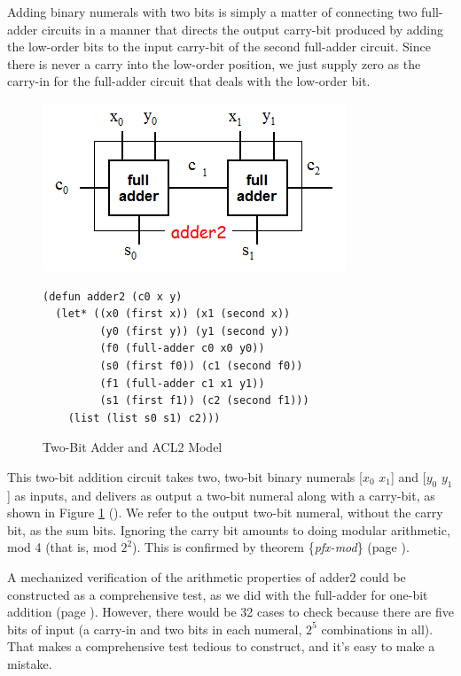 Adding binary numerals with two bits is simply a matter
of connecting two full-adder circuits in a manner that
directs the output carry-bit produced by adding the low-order bits
to the input carry-bit of the second full-adder circuit.
Since there is never a carry into the low-order position,
we just supply zero as the carry-in for the full-adder circuit
that deals with the low-order bit.

\begin{figure}
\begin{center}
\includegraphics[scale=0.25]{Images/adder2.png}
\begin{Verbatim}
(defun adder2 (c0 x y)
  (let* ((x0 (first x)) (x1 (second x))
         (y0 (first y)) (y1 (second y))
         (f0 (full-adder c0 x0 y0))
         (s0 (first f0)) (c1 (second f0))
         (f1 (full-adder c1 x1 y1))
         (s1 (first f1)) (c2 (second f1)))
    (list (list s0 s1) c2)))
\end{Verbatim}
\end{center}
\caption{Two-Bit Adder and ACL2 Model}
\label{fig:adder2}
\end{figure}

This two-bit addition circuit takes two, two-bit binary numerals
[$x_0$ $x_1$] and [$y_0$ $y_1$] as inputs, and
delivers as output a two-bit numeral along with a carry-bit,
as shown in Figure \ref{fig:adder2} (\pageref{fig:adder2}).
We refer to the output two-bit numeral, without the carry bit,
as the sum bits.
Ignoring the carry bit amounts to doing
modular arithmetic, mod 4 (that is, mod $2^2$).
This is confirmed by theorem \{\emph{pfx-mod}\} (page \pageref{pfx-mod}).

A mechanized verification of the arithmetic properties of adder2
could be constructed as a comprehensive test,
as we did with the full-adder for one-bit addition
(page \pageref{full-adder-model-check}).
However, there would be 32 cases to check
because there are five bits of input
(a carry-in and two bits in each numeral, $2^5$ combinations in all).
That makes a comprehensive test tedious to construct,
and it's easy to make a mistake.

